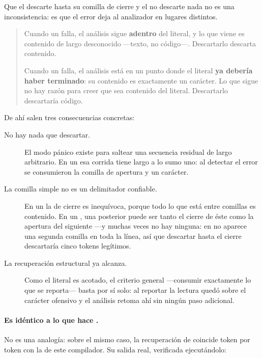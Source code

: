 \documentclass[11pt,a4paper]{article}
\begin{document}
Que el  descarte hasta su comilla de cierre y el  no descarte nada no
es una inconsistencia: es que el error deja al analizador en lugares distintos.

\begin{quote}
Cuando un  falla, el análisis sigue \textbf{adentro} del literal, y lo que viene es
contenido de largo desconocido ---texto, no código---. Descartarlo descarta contenido.

Cuando un  falla, el análisis está en un punto donde el literal \textbf{ya debería
haber terminado}: su contenido es exactamente un carácter. Lo que sigue no hay razón para creer que
sea contenido del literal. Descartarlo descartaría código.
\end{quote}

De ahí salen tres consecuencias concretas:

\begin{description}
	\item[No hay nada que descartar.] El modo pánico existe para saltear una secuencia residual de largo
  arbitrario. En un  esa corrida tiene largo a lo sumo uno: al detectar el error se
  consumieron la comilla de apertura y un carácter.
\item[La comilla simple no es un delimitador confiable.] En un  la  de cierre
  es inequívoca, porque todo lo que está entre comillas es contenido. En un , una
   posterior puede ser tanto el cierre de éste como la apertura del siguiente ---y muchas
  veces no hay ninguna: en  no aparece una segunda comilla en toda la línea, así que
  descartar hasta el cierre descartaría cinco tokens legítimos.
\item[La recuperación estructural ya alcanza.] Como el literal es acotado, el criterio general
  ---consumir exactamente lo que se reporta--- basta por sí solo: al reportar  la lectura
  quedó sobre el carácter ofensivo y el análisis retoma ahí sin ningún paso adicional.
\end{description}

\paragraph{Es idéntico a lo que hace .} No es una analogía: sobre el mismo caso, la
recuperación de  coincide token por token con la de este compilador. Su salida real,
verificada ejecutándolo:
\end{document}
